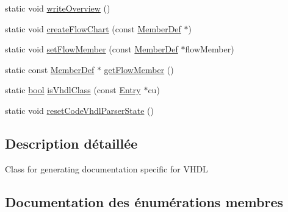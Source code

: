 \begin{DoxyCompactItemize}
\item 
static void \hyperlink{class_vhdl_doc_gen_a658c57fb74c0fde61d0002a979710416}{write\+Overview} ()
\item 
static void \hyperlink{class_vhdl_doc_gen_a2de08afddfa24b4a037c36ac329185ff}{create\+Flow\+Chart} (const \hyperlink{class_member_def}{Member\+Def} $\ast$)
\item 
static void \hyperlink{class_vhdl_doc_gen_a7808cdf56c299daceed3212b65b8a031}{set\+Flow\+Member} (const \hyperlink{class_member_def}{Member\+Def} $\ast$flow\+Member)
\item 
static const \hyperlink{class_member_def}{Member\+Def} $\ast$ \hyperlink{class_vhdl_doc_gen_a12b2126cfa1cf80aeab17ae40d673d67}{get\+Flow\+Member} ()
\item 
static \hyperlink{qglobal_8h_a1062901a7428fdd9c7f180f5e01ea056}{bool} \hyperlink{class_vhdl_doc_gen_a7b7df19eb23b1532bc1d05c7ffe6cd76}{is\+Vhdl\+Class} (const \hyperlink{class_entry}{Entry} $\ast$cu)
\item 
static void \hyperlink{class_vhdl_doc_gen_a60e16e249eaf1829c224b054ff743ce7}{reset\+Code\+Vhdl\+Parser\+State} ()
\end{DoxyCompactItemize}


\subsection{Description détaillée}
Class for generating documentation specific for V\+H\+D\+L 

\subsection{Documentation des énumérations membres}
\hypertarget{class_vhdl_doc_gen_a010ab08982f29df8c0f3d3f0f642f0f0}{}
